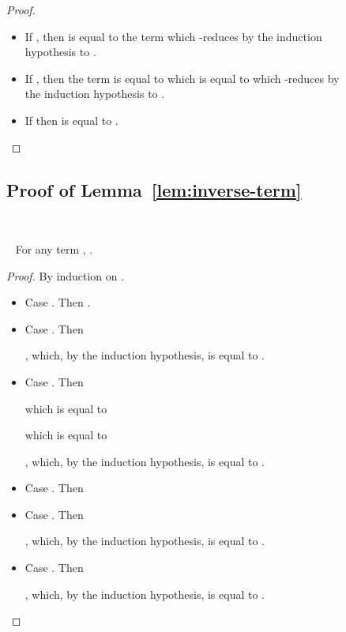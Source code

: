\documentclass{LMCS}
\newcommand{\recap}[2]{\medskip\noindent{\bf #1 \ref{#2}.}~}
\begin{document}
\begin{figure}
{\begin{proof}
\begin{description}
\begin{itemize}
\begin{itemize}
\begin{itemize}
		\item If , then  is equal to the term  which -reduces by the induction hypothesis to .
		\item If , then the term  is equal to  which is equal to  which -reduces by the induction hypothesis to .
		\item If  then  is equal to .\qedhere
	      \end{itemize}
	  \end{itemize}
      \end{itemize}
  \end{description} 
\end{proof}

\subsection{Proof of Lemma~\ref{lem:inverse-term}}\label{proof:inverse-term}~

\recap{Lemma}{lem:inverse-term} For any term , .

\begin{proof}
  By induction on .
  \begin{itemize}
    \item Case . Then .
    \item Case . Then 
      
      
      
      
      
      ,
      which, by the induction hypothesis, is equal to
      .

    \item Case . Then 
      
      
      which is equal to
      
      
      which is equal to
      
      ,
      which, by the induction hypothesis, is equal to
      .

    \item Case . Then 
    \item Case . Then 
      
      
      
      
      
      ,
      which, by the induction hypothesis, is equal to
      .

    \item Case . Then
      
      
      
      
      
      ,
      which, by the induction hypothesis, is equal to
      .
      \qedhere
  \end{itemize}
\end{proof}

}
\end{figure}
\end{document}
